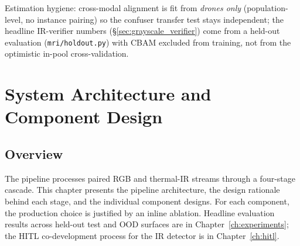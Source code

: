 \documentclass[12pt,a4paper,oneside,openright]{book}
\begin{document}
Estimation hygiene: cross-modal alignment is fit from \emph{drones only} (population-level, no instance pairing) so the confuser transfer test stays independent; the headline IR-verifier numbers (\S\ref{sec:grayscale_verifier}) come from a held-out evaluation (\texttt{mri/holdout.py}) with CBAM excluded from training, not from the optimistic in-pool cross-validation.

\chapter{System Architecture and Component Design}
\label{ch:architecture}

\section{Overview}

The pipeline processes paired RGB and thermal-IR streams through a four-stage cascade. This chapter presents the pipeline architecture, the design rationale behind each stage, and the individual component designs. For each component, the production choice is justified by an inline ablation. Headline evaluation results across held-out test and OOD surfaces are in Chapter~\ref{ch:experiments}; the HITL co-development process for the IR detector is in Chapter~\ref{ch:hitl}.
\end{document}

